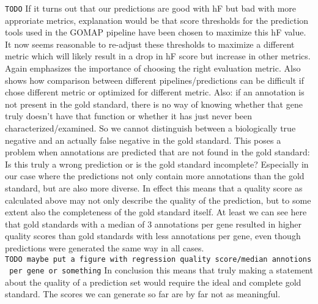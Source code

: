 \documentclass[utf8]{frontiersSCNS}
\begin{document}
\texttt{TODO} If it turns out that our predictions are good with hF but bad with more approriate metrics, explanation would be that score thresholds for the prediction tools used in the GOMAP pipeline have been chosen to maximize this hF value. It now seems reasonable to re-adjust these thresholds to maximize a different metric which will likely result in a drop in hF score but increase in other metrics. Again emphasizes the importance of choosing the right evaluation metric.
Also shows how comparison between different pipelines/predictions can be difficult if chose different metric or optimized for different metric.
Also: if an annotation is not present in the gold standard, there is no way of knowing whether that gene truly doesn't have that function or whether it has just never been characterized/examined. So we cannot distinguish between a biologically true negative and an actually false negative in the gold standard.
This poses a problem when annotations are predicted that are not found in the gold standard: Is this truly a wrong prediction or is the gold standard incomplete? Especially in our case where the predictions not only contain more annotations than the gold standard, but are also more diverse.
In effect this means that a quality score as calculated above may not only describe the quality of the prediction, but to some extent also the completeness of the gold standard itself.
At least we can see here that gold standards with a median of 3 annotations per gene resulted in higher quality scores than gold standards with less annotations per gene, even though predictions were generated the same way in all cases.
\texttt{TODO\ maybe\ put\ a\ figure\ with\ regression\ quality\ score/median\ annotions\ per\ gene\ or\ something}
In conclusion this means that truly making a statement about the quality of a prediction set would require the ideal and complete gold standard.
The scores we can generate so far are by far not as meaningful.
\end{document}
